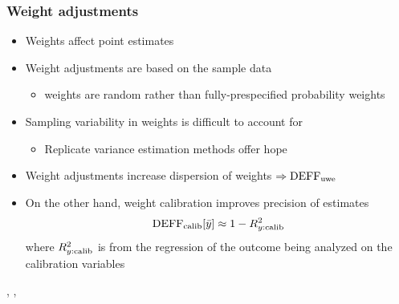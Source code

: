 \documentclass{beamer}
\begin{document}
\begin{frame}\frametitle{Weight adjustments}

\begin{itemize}
    \item Weights affect point estimates
    \item Weight adjustments are based on the sample data
        \begin{itemize} \item weights are random rather than fully-prespecified probability weights \end{itemize}
    \item Sampling variability in weights is difficult to account for
        \begin{itemize}
            \item Replicate variance estimation methods offer hope
        \end{itemize}
    \item Weight adjustments increase dispersion of weights $\Rightarrow {\rm DEFF}_{\rm uwe}$
    \item On the other hand, weight calibration improves precision of estimates
            $$
            {\rm DEFF}_{\rm calib} [\bar y] \approx 1 - R^2_{y:{\rm calib}}
            $$
            where $R^2_{y:{\rm calib}}$ is from the regression of the outcome being analyzed on the calibration variables
\end{itemize}

\medskip

\citet{deville:sarndal:1992},
\citet{henry:valliant:2015},
\citet{devaud:tille:2019}

\end{frame}
\end{document}
